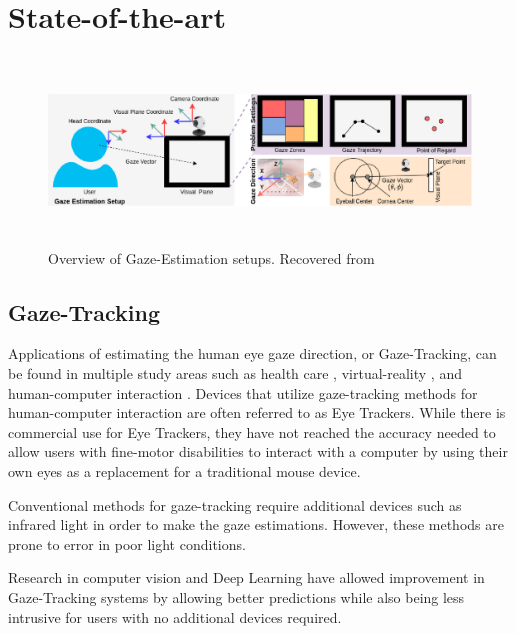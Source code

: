 
\chapter{State-of-the-art}
\label{Chap1}

\begin{figure}
    \centering
    \includegraphics[width=\textwidth,height=5cm]{img/figures/gaze_estimation_setup.png}
    \caption{Overview of Gaze-Estimation setups. Recovered from \cite{survey_automatic_gaze_ghosh}}
    \label{gaze_estimation_setup}
 \end{figure}


\section{Gaze-Tracking}
Applications of estimating the human eye gaze direction, or Gaze-Tracking, can be found in multiple study areas such as health care \cite{EyeTrackMedical}, virtual-reality \cite{EyeVR}, and human-computer interaction \cite{Gaze-Controlled-Web}. Devices that utilize gaze-tracking methods for human-computer interaction are often referred to as Eye Trackers. While there is commercial use for Eye Trackers, they have not reached the accuracy needed to allow users with fine-motor disabilities to interact with a computer by using their own eyes as a replacement for a traditional mouse device.

Conventional methods for gaze-tracking require additional devices such as infrared light in order to make the gaze estimations. However, these methods are prone to error in poor light conditions.

Research in computer vision and Deep Learning have allowed improvement in Gaze-Tracking systems by allowing better predictions while also being less intrusive for users with no additional devices required.


